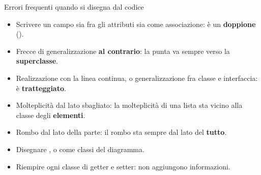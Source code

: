 \begin{attenzione}{Errori frequenti quando si disegna dal codice}
\begin{itemize}[nosep, leftmargin=*]
  \item Scrivere un campo sia fra gli attributi sia come associazione: è un \textbf{doppione} ().
  \item Frecce di generalizzazione \textbf{al contrario}: la punta va sempre verso la \textbf{superclasse}.
  \item Realizzazione con la linea continua, o generalizzazione fra classe e interfaccia:  è
        \textbf{tratteggiato}.
  \item Molteplicità dal lato sbagliato: la molteplicità di una lista sta vicino alla classe degli
        \textbf{elementi}.
  \item Rombo dal lato della parte: il rombo sta sempre dal lato del \textbf{tutto}.
  \item Disegnare ,  o  come classi del diagramma.
  \item Riempire ogni classe di getter e setter: non aggiungono informazioni.
\end{itemize}
\end{attenzione}

